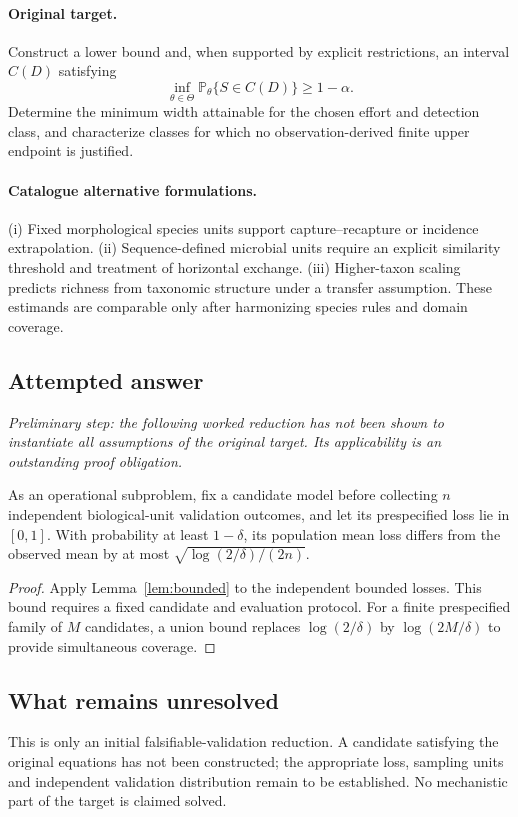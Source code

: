 \documentclass[11pt]{article}
\begin{document}
\paragraph{Original target.}
Construct a lower bound and, when supported by explicit restrictions, an interval $C(D)$ satisfying
    \[\inf_{\theta\in\Theta}\mathbb{P}_\theta\{S\in C(D)\}\geq1-\alpha.\]
    Determine the minimum width attainable for the chosen effort and detection class, and characterize classes for which no observation-derived finite upper endpoint is justified.
\paragraph{Catalogue alternative formulations.}
(i) Fixed morphological species units support capture--recapture or incidence extrapolation. (ii) Sequence-defined microbial units require an explicit similarity threshold and treatment of horizontal exchange. (iii) Higher-taxon scaling predicts richness from taxonomic structure under a transfer assumption. These estimands are comparable only after harmonizing species rules and domain coverage.
\subsection{Attempted answer}
\noindent\emph{Preliminary step: the following worked reduction has not been shown to instantiate all assumptions of the original target. Its applicability is an outstanding proof obligation.}

\begin{proposition}
As an operational subproblem, fix a candidate model before collecting $n$ independent biological-unit validation outcomes, and let its prespecified loss lie in $[0,1]$. With probability at least $1-\delta$, its population mean loss differs from the observed mean by at most $\sqrt{\log(2/\delta)/(2n)}$.
\end{proposition}
\begin{proof}
Apply Lemma~\ref{lem:bounded} to the independent bounded losses. This bound requires a fixed candidate and evaluation protocol. For a finite prespecified family of $M$ candidates, a union bound replaces $\log(2/\delta)$ by $\log(2M/\delta)$ to provide simultaneous coverage.
\end{proof}
\subsection{What remains unresolved}
This is only an initial falsifiable-validation reduction. A candidate satisfying the original equations has not been constructed; the appropriate loss, sampling units and independent validation distribution remain to be established. No mechanistic part of the target is claimed solved.
\end{document}
